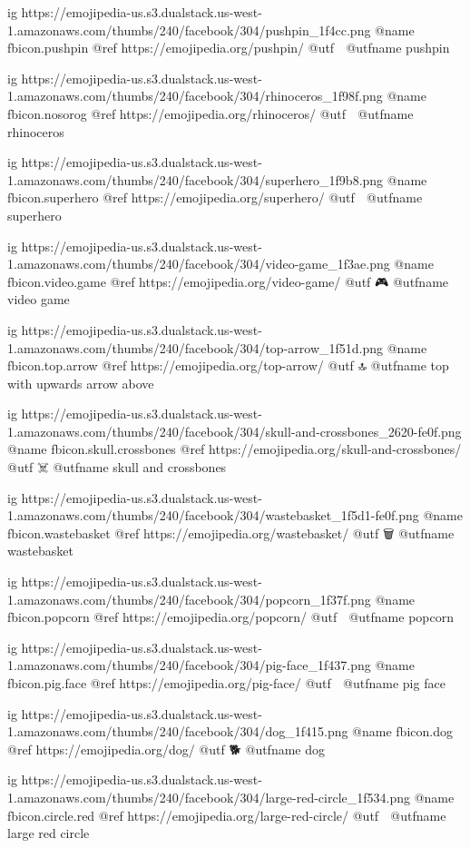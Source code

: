 	ig https://emojipedia-us.s3.dualstack.us-west-1.amazonaws.com/thumbs/240/facebook/304/pushpin_1f4cc.png
	@name fbicon.pushpin
	@ref https://emojipedia.org/pushpin/
	@utf 📌
	@utfname pushpin

	ig https://emojipedia-us.s3.dualstack.us-west-1.amazonaws.com/thumbs/240/facebook/304/rhinoceros_1f98f.png
	@name fbicon.nosorog
	@ref https://emojipedia.org/rhinoceros/
	@utf 🦏
	@utfname rhinoceros

	ig https://emojipedia-us.s3.dualstack.us-west-1.amazonaws.com/thumbs/240/facebook/304/superhero_1f9b8.png
	@name fbicon.superhero
	@ref https://emojipedia.org/superhero/
	@utf 🦸
	@utfname superhero

	ig https://emojipedia-us.s3.dualstack.us-west-1.amazonaws.com/thumbs/240/facebook/304/video-game_1f3ae.png
	@name fbicon.video.game
	@ref https://emojipedia.org/video-game/
	@utf 🎮
	@utfname video game

	ig https://emojipedia-us.s3.dualstack.us-west-1.amazonaws.com/thumbs/240/facebook/304/top-arrow_1f51d.png
	@name fbicon.top.arrow
	@ref https://emojipedia.org/top-arrow/
	@utf 🔝
	@utfname top with upwards arrow above

	ig https://emojipedia-us.s3.dualstack.us-west-1.amazonaws.com/thumbs/240/facebook/304/skull-and-crossbones_2620-fe0f.png
	@name fbicon.skull.crossbones
	@ref https://emojipedia.org/skull-and-crossbones/
	@utf ☠️
	@utfname skull and crossbones

	ig https://emojipedia-us.s3.dualstack.us-west-1.amazonaws.com/thumbs/240/facebook/304/wastebasket_1f5d1-fe0f.png
	@name fbicon.wastebasket
	@ref https://emojipedia.org/wastebasket/
	@utf 🗑
	@utfname wastebasket

	ig https://emojipedia-us.s3.dualstack.us-west-1.amazonaws.com/thumbs/240/facebook/304/popcorn_1f37f.png
	@name fbicon.popcorn
	@ref https://emojipedia.org/popcorn/
	@utf 🍿
	@utfname popcorn

	ig https://emojipedia-us.s3.dualstack.us-west-1.amazonaws.com/thumbs/240/facebook/304/pig-face_1f437.png
	@name fbicon.pig.face
	@ref https://emojipedia.org/pig-face/
	@utf 🐷
	@utfname pig face

	ig https://emojipedia-us.s3.dualstack.us-west-1.amazonaws.com/thumbs/240/facebook/304/dog_1f415.png
	@name fbicon.dog
	@ref https://emojipedia.org/dog/
	@utf 🐕
	@utfname dog

	ig https://emojipedia-us.s3.dualstack.us-west-1.amazonaws.com/thumbs/240/facebook/304/large-red-circle_1f534.png
	@name fbicon.circle.red
	@ref https://emojipedia.org/large-red-circle/
	@utf 🔴
	@utfname large red circle

